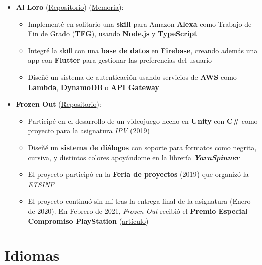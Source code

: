\documentclass[letterpaper, 12pt, dvipsnames]{article}
\begin{document}
\begin{itemize}
    \item \textbf{Al Loro} (\href{https://github.com/algono/FeedTheParrot-RSS}{Repositorio}) (\href{http://hdl.handle.net/10251/174256}{Memoria}):
          \begin{itemize}
              \item Implementé en solitario una \textbf{skill} para Amazon \textbf{Alexa} como Trabajo de Fin de Grado (\textbf{TFG}), usando \textbf{Node.js} y \textbf{TypeScript}
              \item Integré la skill con una \textbf{base de datos} en \textbf{Firebase}, creando además una app con \textbf{Flutter} para gestionar las preferencias del usuario
              \item Diseñé un sistema de autenticación usando servicios de \textbf{AWS} como \textbf{Lambda}, \textbf{DynamoDB} o \textbf{API Gateway}
          \end{itemize}
    \item \textbf{Frozen Out} (\href{https://github.com/Freezer-Games/Frozen-Out}{Repositorio}):
          \begin{itemize}
              \item Participé en el desarrollo de un videojuego hecho en \textbf{Unity} con \textbf{C\#} como proyecto para la asignatura \emph{IPV} (2019)
              \item Diseñé un \textbf{sistema de diálogos} con soporte para formatos como negrita, cursiva, y distintos colores apoyándome en la librería \href{https://yarnspinner.dev/}{\textbf{\emph{YarnSpinner}}}
              \item El proyecto participó en la \href{https://es-es.facebook.com/etsinf/videos/feria-de-proyectos-de-estudiantes-2019/1921312964681641/}{\textbf{Feria de proyectos} (2019)} que organizó la \emph{ETSINF}
              \item El proyecto continuó sin mí tras la entrega final de la asignatura (Enero de 2020). En Febrero de 2021, \emph{Frozen Out} recibió el \textbf{Premio Especial Compromiso PlayStation} (\href{https://www.inf.upv.es/www/etsinf/es/premio-especial-compromiso-playstation-para-el-videojuego-frozen-out-creado-por-estudiantes-de-la-etsinf-y-la-facultat-de-bb-aa/}{artículo})
          \end{itemize}
\end{itemize}

\section*{Idiomas}
\end{document}
